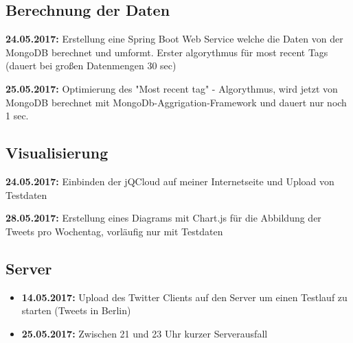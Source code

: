 \documentclass[12pt, 
	a4paper, 
	oneside, 
	leqno]{scrreprt}
\begin{document}
\subsection*{Berechnung der Daten}
  \item \textbf{24.05.2017:} Erstellung eine Spring Boot Web Service welche die Daten von der MongoDB berechnet und umformt. Erster algorythmus für most recent Tags (dauert bei großen Datenmengen 30 sec)
  \item \textbf{25.05.2017:} Optimierung des "Most recent tag" - Algorythmus, wird jetzt von MongoDB berechnet mit MongoDb-Aggrigation-Framework und dauert nur noch 1 sec.

\subsection*{Visualisierung}
  \item \textbf{24.05.2017:} Einbinden der jQCloud auf meiner Internetseite und Upload von Testdaten
  \item \textbf{28.05.2017:} Erstellung eines Diagrams mit Chart.js für die Abbildung der Tweets pro Wochentag, vorläufig nur mit Testdaten

\subsection*{Server}

\begin{itemize}
  \item \textbf{14.05.2017:} Upload des Twitter Clients auf den Server um einen Testlauf zu starten (Tweets in Berlin)
  \item \textbf{25.05.2017:} Zwischen 21 und 23 Uhr kurzer Serverausfall
\end{itemize}
\end{document}
